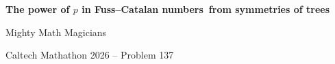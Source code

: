 \documentclass[aspectratio=169]{beamer}
\begin{document}
\begin{frame}[plain]
  \centering
  \vfill
  {\Large\bfseries The power of $p$ in Fuss--Catalan numbers\ from symmetries of trees\par}
  \vspace{1.2em}
  {\large Mighty Math Magicians\par}
  \vspace{0.6em}
  {\small Caltech Mathathon 2026 -- Problem 137\par}
  \vfill
\end{frame}
\end{document}
